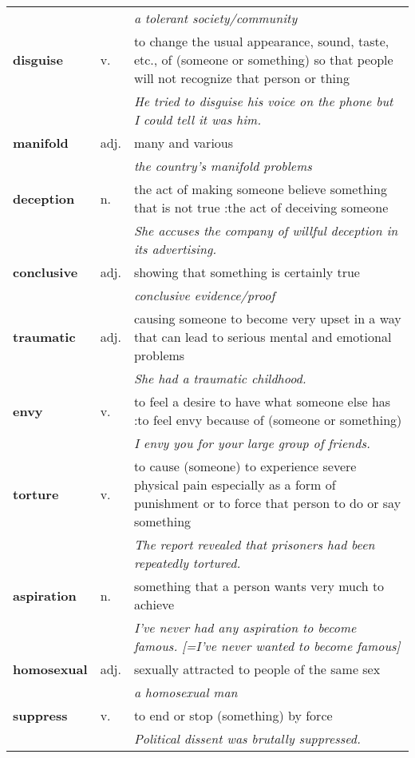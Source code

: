\documentclass[a4paper]{article}
\begin{document}
\begin{longtable}{llp{11cm}}
 & & \textit{a tolerant society/community}\\[0.08cm]
\textbf{disguise} & v. &  to change the usual appearance, sound, taste, etc., of (someone or something) so that people will not recognize that person or thing \\
 & & \textit{He tried to disguise his voice on the phone but I could tell it was him.}\\[0.08cm]
\textbf{manifold} & adj. &  many and various \\
 & & \textit{the country's manifold problems}\\[0.08cm]
\textbf{deception} & n. &  the act of making someone believe something that is not true :the act of deceiving someone \\
 & & \textit{She accuses the company of willful deception in its advertising.}\\[0.08cm]
\textbf{conclusive} & adj. &  showing that something is certainly true \\
 & & \textit{conclusive evidence/proof}\\[0.08cm]
\textbf{traumatic} & adj. &  causing someone to become very upset in a way that can lead to serious mental and emotional problems \\
 & & \textit{She had a traumatic childhood.}\\[0.08cm]
\textbf{envy} & v. &  to feel a desire to have what someone else has :to feel envy because of (someone or something) \\
 & & \textit{I envy you for your large group of friends.}\\[0.08cm]
\textbf{torture} & v. &  to cause (someone) to experience severe physical pain especially as a form of punishment or to force that person to do or say something \\
 & & \textit{The report revealed that prisoners had been repeatedly tortured.}\\[0.08cm]
\textbf{aspiration} & n. &  something that a person wants very much to achieve \\
 & & \textit{I've never had any aspiration to become famous. [=I've never wanted to become famous]}\\[0.08cm]
\textbf{homosexual} & adj. &  sexually attracted to people of the same sex \\
 & & \textit{a homosexual man}\\[0.08cm]
\textbf{suppress} & v. &  to end or stop (something) by force \\
 & & \textit{Political dissent was brutally suppressed.}\\[0.08cm]

\end{longtable}
\end{document}
